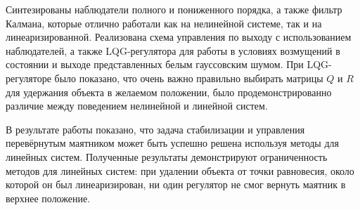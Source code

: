 Синтезированы наблюдатели полного и пониженного порядка, а также 
фильтр Калмана, которые отлично работали как на нелинейной системе, так и на
линеаризированной. Реализована схема управления по 
выходу с использованием наблюдателей, а также LQG-регулятора для 
работы в условиях возмущений в состоянии и выходе представленных белым
гауссовским шумом. При LQG-регуляторе было показано, что
очень важно правильно выбирать матрицы $Q$ и $R$ для удержания объекта
в желаемом положении, было продемонстрированно различие между поведением 
нелинейной и линейной систем.

В результате работы показано, что задача стабилизации и управления 
перевёрнутым маятником может быть успешно решена используя методы
для линейных систем. Полученные результаты демонстрируют ограниченность
методов для линейных систем: при удалении объекта от точки равновесия, около
которой он был линеаризирован, ни один регулятор не смог вернуть маятник в 
верхнее положение.